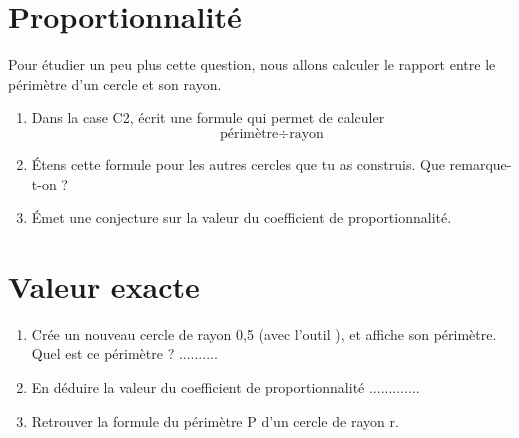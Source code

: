 \documentclass[a4paper,10pt]{article}
\begin{document}
\section{Proportionnalité}
Pour étudier un peu plus cette question, nous allons calculer le rapport entre le périmètre d'un cercle et son rayon.

\begin{enumerate}
	\item Dans la case C2, écrit une formule qui permet de calculer
	      $$ \text{périmètre} ÷ \text{rayon} $$
	\item Étens cette formule pour les autres cercles que tu as construis. Que remarque-t-on ?
	\item Émet une conjecture sur la valeur du coefficient de proportionnalité.
\end{enumerate}

\section{Valeur exacte}

\begin{enumerate}
	\item Crée un nouveau cercle de rayon 0,5 (avec l'outil ), et affiche son périmètre. Quel est ce périmètre ? ..........
	\item En déduire la valeur du coefficient de proportionnalité .............
	\item Retrouver la formule du périmètre P d'un cercle de rayon r.
\end{enumerate}

\end{document}
